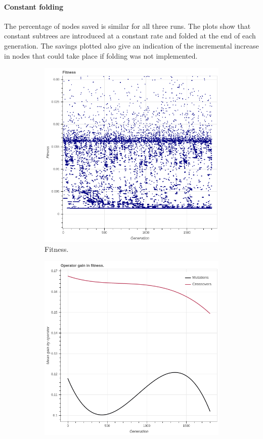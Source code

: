 \paragraph{Constant folding}
The percentage of nodes saved is similar for all three runs. The plots show that constant subtrees are introduced at a constant rate and folded at the end of each generation. The savings plotted also give an indication of the incremental increase in nodes that could take place if folding was not implemented. 
 \begin{figure}
    \begin{subfigure}{0.5\textwidth}
        \includegraphics[width=0.8\linewidth]{figures/incrementalfitness30s.png}
        \caption{Fitness.}
    \end{subfigure}
    \begin{subfigure}{0.5\textwidth}
        \includegraphics[width=0.8\linewidth]{figures/incrementaloperatorgain30s.png}

\end{subfigure}
\end{figure}
